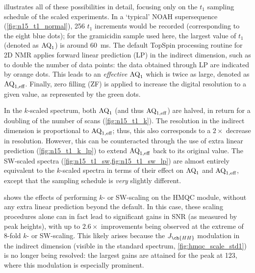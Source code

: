  illustrates all of these possibilities in detail, focusing only on the $t_1$ sampling schedule of the scaled \nitrogen{} experiments.
In a `typical' NOAH supersequence (\cref{fig:n15_t1_normal}), 256 $t_1$ increments would be recorded (corresponding to the eight blue dots);
for the gramicidin sample used here, the largest value of $t_1$ (denoted as $\text{AQ}_1$) is around \qty{60}{\ms}.
The default TopSpin processing routine for 2D NMR applies forward linear prediction (LP)\autocite{Ni1986JMR,Tirendi1989JMR,Led1991CR,Koehl1999PNMRS} in the indirect dimension, such as to double the number of data points: the data obtained through LP are indicated by orange dots.
This leads to an \textit{effective} $\text{AQ}_1$ which is twice as large, denoted as $\text{AQ}_{1,\text{eff}}$.
Finally, zero filling (ZF) is applied to increase the digital resolution to a given value, as represented by the green dots.

In the $k$-scaled spectrum, both $\text{AQ}_1$ (and thus $\text{AQ}_{1,\text{eff}}$) are halved, in return for a doubling of the number of scans (\cref{fig:n15_t1_k}).
The resolution in the indirect dimension is proportional to $\text{AQ}_{1,\text{eff}}$; thus, this also corresponds to a $2\times$ decrease in resolution.
However, this can be counteracted through the use of extra linear prediction (\cref{fig:n15_t1_k_lp}) to extend $\text{AQ}_{1,\text{eff}}$ back to its original value.
The SW-scaled spectra (\cref{fig:n15_t1_sw,fig:n15_t1_sw_lp}) are almost entirely equivalent to the $k$-scaled spectra in terms of their effect on $\text{AQ}_1$ and $\text{AQ}_{1,\text{eff}}$, except that the sampling schedule is \textit{very} slightly different.

 shows the effects of performing $k$- or SW-scaling on the \nitrogen{} HMQC module, without any extra linear prediction beyond the default.
In this case, these scaling procedures alone can in fact lead to significant gains in SNR (as measured by peak heights), with up to $2.6\times$ improvements being observed at the extreme of 8-fold $k$- or SW-scaling.
This likely arises because the $J_{\ch{HH}}$ modulation in the indirect dimension (visible in the standard spectrum, \cref{fig:hmqc_scale_std1}) is no longer being resolved: the largest gains are attained for the peak at \qty{123}{\ppm}, where this modulation is especially prominent.

